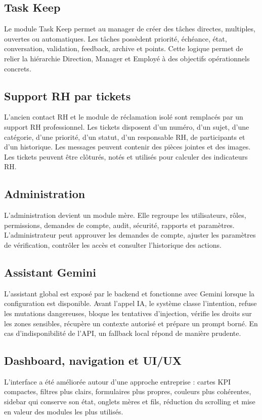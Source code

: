 \documentclass[12pt,a4paper]{report}
\begin{document}
\subsection{Task Keep}
Le module Task Keep permet au manager de créer des tâches directes, multiples, ouvertes ou automatiques. Les tâches possèdent priorité, échéance, état, conversation, validation, feedback, archive et points. Cette logique permet de relier la hiérarchie Direction, Manager et Employé à des objectifs opérationnels concrets.

\subsection{Support RH par tickets}
L'ancien contact RH et le module de réclamation isolé sont remplacés par un support RH professionnel. Les tickets disposent d'un numéro, d'un sujet, d'une catégorie, d'une priorité, d'un statut, d'un responsable RH, de participants et d'un historique. Les messages peuvent contenir des pièces jointes et des images. Les tickets peuvent être clôturés, notés et utilisés pour calculer des indicateurs RH.

\subsection{Administration}
L'administration devient un module mère. Elle regroupe les utilisateurs, rôles, permissions, demandes de compte, audit, sécurité, rapports et paramètres. L'administrateur peut approuver les demandes de compte, ajuster les paramètres de vérification, contrôler les accès et consulter l'historique des actions.

\subsection{Assistant Gemini}
L'assistant global est exposé par le backend et fonctionne avec Gemini lorsque la configuration est disponible. Avant l'appel IA, le système classe l'intention, refuse les mutations dangereuses, bloque les tentatives d'injection, vérifie les droits sur les zones sensibles, récupère un contexte autorisé et prépare un prompt borné. En cas d'indisponibilité de l'API, un fallback local répond de manière prudente.

\subsection{Dashboard, navigation et UI/UX}
L'interface a été améliorée autour d'une approche entreprise : cartes KPI compactes, filtres plus clairs, formulaires plus propres, couleurs plus cohérentes, sidebar qui conserve son état, onglets mères et fils, réduction du scrolling et mise en valeur des modules les plus utilisés.
\end{document}
